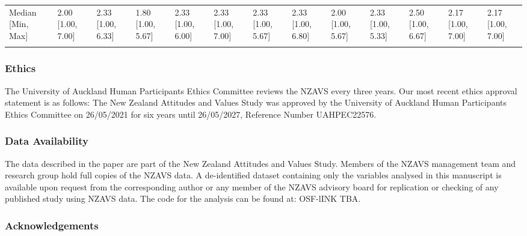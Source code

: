 \documentclass[
  single column]{article}
\begin{document}
\begin{landscape}
\begin{longtable}[t]{lllllllllllll}
Median [Min, Max] & 2.00 [1.00, 7.00] & 2.33 [1.00, 6.33] & 1.80 [1.00, 5.67] & 2.33 [1.00, 6.00] & 2.33 [1.00, 7.00] & 2.33 [1.00, 5.67] & 2.33 [1.00, 6.80] & 2.00 [1.00, 5.67] & 2.33 [1.00, 5.33] & 2.50 [1.00, 6.67] & 2.17 [1.00, 7.00] & 2.17 [1.00, 7.00]\\
\addlinespace
\cellcolor{gray!10}{Missing} & \cellcolor{gray!10}{1 (0.0\%)} & \cellcolor{gray!10}{2 (0.1\%)} & \cellcolor{gray!10}{0 (0\%)} & \cellcolor{gray!10}{2 (0.1\%)} & \cellcolor{gray!10}{6 (0.2\%)} & \cellcolor{gray!10}{1 (0.1\%)} & \cellcolor{gray!10}{1 (0.7\%)} & \cellcolor{gray!10}{0 (0\%)} & \cellcolor{gray!10}{0 (0\%)} & \cellcolor{gray!10}{1 (0.2\%)} & \cellcolor{gray!10}{1 (0.1\%)} & \cellcolor{gray!10}{15 (0.0\%)}\\*
\end{longtable}
\endgroup{}


\end{landscape}

\newpage{}

\subsubsection{Ethics}\label{ethics}

The University of Auckland Human Participants Ethics Committee reviews
the NZAVS every three years. Our most recent ethics approval statement
is as follows: The New Zealand Attitudes and Values Study was approved
by the University of Auckland Human Participants Ethics Committee on
26/05/2021 for six years until 26/05/2027, Reference Number UAHPEC22576.

\subsubsection{Data Availability}\label{data-availability}

The data described in the paper are part of the New Zealand Attitudes
and Values Study. Members of the NZAVS management team and research
group hold full copies of the NZAVS data. A de-identified dataset
containing only the variables analysed in this manuscript is available
upon request from the corresponding author or any member of the NZAVS
advisory board for replication or checking of any published study using
NZAVS data. The code for the analysis can be found at: OSF-lINK TBA.

\subsubsection{Acknowledgements}\label{acknowledgements}
\end{document}
